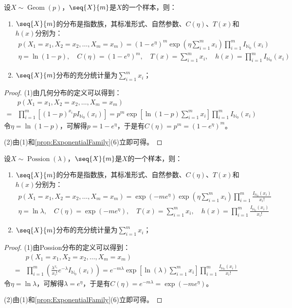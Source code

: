\begin{theorem}
	设$X\sim\operatorname{Geom}(p)$，$\seq{X}{m}$是$X$的一个样本，则：
	\begin{enumerate}
		\item $\seq{X}{m}$的分布是指数族，其标准形式、自然参数、$C(\eta)$、$T(x)$和$h(x)$分别为：
		\begin{gather*}
			p(X_1=x_1,X_2=x_2,\dots,X_m=x_m)=(1-e^{\eta})^m\exp\left(\eta\sum_{i=1}^{m}x_i\right)\prod_{i=1}^{m}I_{\mathbb{N}_0}(x_i) \\
			\eta=\ln(1-p),\quad C(\eta)=(1-e^{\eta})^m,\quad T(x)=\sum_{i=1}^{m}x_i,\quad h(x)=\prod_{i=1}^{m}I_{\mathbb{N}_0}(x_i)
		\end{gather*}
		\item $\seq{X}{m}$分布的充分统计量为$\sum\limits_{i=1}^{m}x_i$；
	\end{enumerate}
\end{theorem}
\begin{proof}
	(1)由几何分布的定义可以得到：
	\begin{align*}
		&p(X_1=x_1,X_2=x_2,\dots,X_m=x_m) \\
		=&\prod_{i=1}^{m}[(1-p)^{x_i}pI_{\mathbb{N}_0}(x_i)] =p^m\exp\left[\ln(1-p)\sum_{i=1}^{m}x_i\right]\prod_{i=1}^{m}I_{\mathbb{N}_0}(x_i)
	\end{align*}
	令$\eta=\ln(1-p)$，可解得$p=1-e^{\eta}$，于是有$C(\eta)=p^m=(1-e^{\eta})^m$。\par
	(2)由(1)和\cref{prop:ExponentialFamily}(6)立即可得。
\end{proof}

\begin{theorem}
	设$X\sim\operatorname{Possion}(\lambda)$，$\seq{X}{m}$是$X$的一个样本，则：
	\begin{enumerate}
		\item $\seq{X}{m}$的分布是指数族，其标准形式、自然参数、$C(\eta)$、$T(x)$和$h(x)$分别为：
		\begin{gather*}
			p(X_1=x_1,X_2=x_2,\dots,X_m=x_m)=\exp(-me^{\eta})\exp\left(\eta\sum_{i=1}^{m}x_i\right)\prod_{i=1}^{m}\frac{I_{\mathbb{N}_0}(x_i)}{x_i!} \\
			\eta=\ln\lambda,\quad C(\eta)=\exp(-me^{\eta}),\quad T(x)=\sum_{i=1}^{m}x_i,\quad h(x)=\prod_{i=1}^{m}\frac{I_{\mathbb{N}_0}(x_i)}{x_i!}
		\end{gather*}
		\item $\seq{X}{m}$分布的充分统计量为$\sum\limits_{i=1}^{m}x_i$；
	\end{enumerate}
\end{theorem}
\begin{proof}
	(1)由Possion分布的定义可以得到：
	\begin{align*}
		&p(X_1=x_1,X_2=x_2,\dots,X_m=x_m) \\
		=&\prod_{i=1}^{m}\left(\frac{\lambda^{x_i}}{x_i!}e^{-\lambda}I_{\mathbb{N}_0}(x_i)\right) =e^{-m\lambda}\exp\left[\ln(\lambda)\sum_{i=1}^{m}x_i\right]\prod_{i=1}^{m}\frac{I_{\mathbb{N}_0}(x_i)}{x_i!}
	\end{align*}
	令$\eta=\ln\lambda$，可解得$\lambda=e^{\eta}$，于是有$C(\eta)=e^{-m\lambda}=\exp(-me^{\eta})$。\par
	(2)由(1)和\cref{prop:ExponentialFamily}(6)立即可得。
\end{proof}

